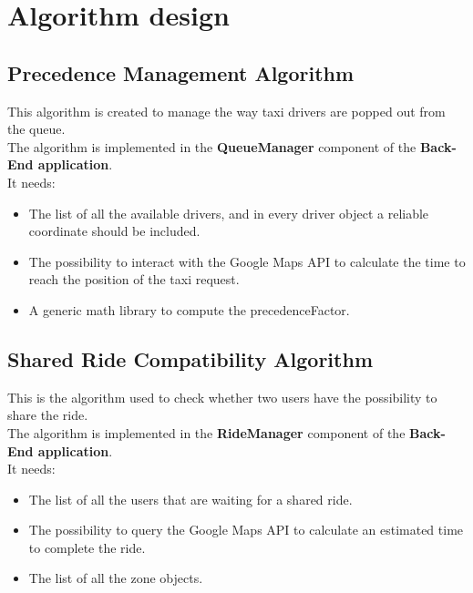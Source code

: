 

\section{Algorithm design} %
\label{sec:algorithm_design}


\subsection{Precedence Management Algorithm} %
\label{sub:first_algorithm}
This algorithm is created to manage the way taxi drivers are popped out from the queue.\\
The algorithm is implemented in the \textbf{QueueManager} component of the \textbf{Back-End application}.\\
It needs:

\begin{itemize}
	\item The list of all the available drivers, and in every driver object a reliable coordinate should be included.
	\item The possibility to interact with the Google Maps API to calculate the time to reach the position of the taxi request.
	\item A generic math library to compute the precedenceFactor.
\end{itemize}







\subsection{Shared Ride Compatibility Algorithm} %
\label{sub:second_algorithm}
This is the algorithm used to check whether two users have the possibility to share the ride.\\
The algorithm is implemented in the \textbf{RideManager} component of the \textbf{Back-End application}.\\
It needs:
\begin{itemize}
	\item The list of all the users that are waiting for a shared ride.
	\item The possibility to query the Google Maps API to calculate an estimated time to complete the ride.
	\item The list of all the zone objects.
\end{itemize}

